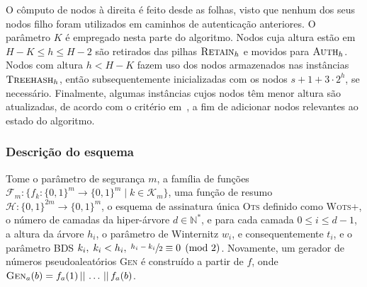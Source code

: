 \documentclass[12pt,notitlepage]{report}
\newcommand{\hh}{\mathcal{H}}
\newcommand{\concat}{\, \vert \vert \,}
\newcommand{\binwds}[1]{\{0, 1\}^{#1}}
\newcommand{\wotsplus}{\textsc{Wots+}}
\begin{document}
O cômputo de nodos à direita é feito desde as folhas, visto que nenhum dos seus nodos filho foram utilizados em caminhos de autenticação anteriores. O parâmetro $K$ é empregado nesta parte do algoritmo. Nodos cuja altura estão em $H - K \leq h \leq H - 2$ são retirados das pilhas $\textsc{Retain}_{h}$ e movidos para $\textsc{Auth}_h$. Nodos com altura $h < H - K$ fazem uso dos nodos armazenados nas instâncias $\textsc{Treehash}_{h}$, então subsequentemente inicializadas com
os nodos $s + 1 + 3 \cdot 2^h$, se necessário. Finalmente, algumas instâncias cujos nodos têm menor altura são atualizadas, de acordo com o critério em~\cite[4.5]{Bernstein:2008:PQC:1522375}, a fim de adicionar nodos relevantes ao estado do algoritmo.

\subsubsection{Descrição do esquema}

Tome o parâmetro de segurança $m$, a família de funções $\mathcal{F}_m : \{f_k : \binwds{m} \longrightarrow \binwds{m} \mid k \in \mathcal{K}_m\}$, uma função de resumo $\hh{} : \binwds{2m} \longrightarrow \binwds{m}$, o esquema de assinatura única \textsc{Ots} definido como \wotsplus{}, o número de camadas da hiper-árvore $d \in \mathbb{N}^{*}$, e para cada camada $0 \leq i \leq d - 1$, a altura da árvore $h_i$, o parâmetro de Winternitz $w_i$, e consequentemente $t_i$, e o parâmetro BDS $k_i, \; k_i < h_i, \; \sfrac{h_i - k_i}{2} \equiv 0 \pmod{2}$. Novamente, um gerador de números pseudoaleatórios \textsc{Gen} é construído a partir de $f$, onde $\textsc{Gen}_{a}(b) = f_a(1) \concat \dots \concat f_a(b)$.
\end{document}
